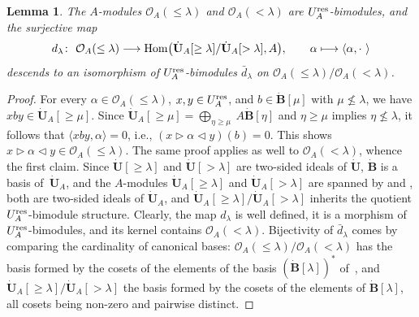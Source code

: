 \documentclass[10pt,a4paper]{amsart}
\numberwithin{equation}{section}
\newtheorem{lem}[teo]{Lemma}
\theoremstyle{definition}
\newcommand{\Oo}{{\mathcal O}}
\newcommand{\smallbullet}{%
\vcenter{\hbox{\,\scalebox{0.5}{$\bullet$}\,}}
}
\begin{document}
\begin{lem} The $A$-modules $\Oo_A(\leq \lambda)$ and $\Oo_A(< \lambda)$ are $U_A^{\rm res}$-bimodules, and the surjective map
\begin{gather}\label{dlambdamap}
d_\lambda\colon\ \Oo_A(\leq \lambda)\longrightarrow {\rm Hom}\bigl( \dot{\mathbf{U}}_A [\geq \lambda]/ \dot{\mathbf{U}}_A [> \lambda],A\bigr),\qquad \alpha\longmapsto\langle \alpha , \cdot \ \rangle
\end{gather}
descends to an isomorphism of $U_A^{\rm res}$-bimodules $\bar{d}_\lambda$ on $\Oo_A(\leq \lambda)/\Oo_A(< \lambda)$.
\end{lem}
\begin{proof} For every $\alpha\in \Oo_A(\leq \lambda)$, $x,y\in U_A^{\rm res}$, and $b\in \dot{\mathbf{B}} [\mu]$ with $\mu \nleqslant \lambda$, we have $xby \in \dot{\mathbf{U}}_A [\geq \mu]$. Since $\dot{\mathbf{U}}_A [\geq \mu]= \bigoplus_{\eta\geq \mu}\ A\dot{\mathbf{B}}[\eta]$ and $\eta\geq \mu$ implies $\eta \nleqslant \lambda$, it follows that $\langle xby, \alpha\rangle=0$, i.e., $(x\rhd \alpha \lhd y)(b)=0$. This shows $x\rhd \alpha \lhd y \in \Oo_A(\leq \lambda)$. The same proof applies as well to $\Oo_A(<\lambda)$, whence the first claim. Since $\dot{\mathbf{U}} [\geq \lambda]$ and $\dot{\mathbf{U}} [> \lambda]$ are two-sided ideals of $\dot{\mathbf{U}}$, $\dot{\mathbf{B}}$ is a basis of~$\dot{\mathbf{U}}_A$, and the $A$-modules $\dot{\mathbf{U}}_A [\geq \lambda]$ and $\dot{\mathbf{U}}_A [> \lambda]$ are spanned by  and , both are two-sided ideals of $\dot{\mathbf{U}}_A$, and $\dot{\mathbf{U}}_A [\geq \lambda]/ \dot{\mathbf{U}}_A [> \lambda]$ inherits the quotient $U_A^{\rm res}$-bimodule structure. Clearly, the map $d_\lambda$ is well defined, it is a morphism of $U_A^{\rm res}$-bimodules, and its kernel contains $\Oo_A(< \lambda)$. Bijectivity of $\bar{d}_\lambda$ comes by comparing the cardinality of canonical bases: $\Oo_A(\leq \lambda)/\Oo_A(< \lambda)$ has the basis formed by the cosets of the elements of the basis $(\dot{\mathbf{B}}[\lambda])^*$ of~\smash{${}_A \overset{\raisebox{-1.5pt}{\scriptsize$\smallbullet$}}{C} (\lambda')$}, and $\dot{\mathbf{U}}_A [\geq \lambda]/ \dot{\mathbf{U}}_A [> \lambda]$ the basis formed by the cosets of the elements of $\dot{\mathbf{B}}[\lambda]$, all cosets being non-zero and pairwise distinct.
\end{proof}
\end{document}
